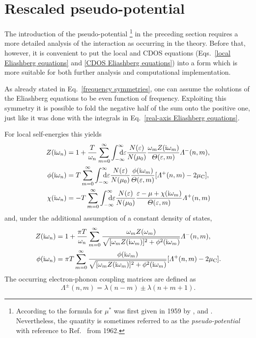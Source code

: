 \section{Rescaled  pseudo-potential}

The introduction of the  pseudo-potential%
%
\footnote{According to  \cite[187]{Schrieffer83} the formula
for $\mu^*$ was first given in 1959 by ,  and
 \cite[83]{BogoliubovTolmachevShirkov59}. Nevertheless, the
quantity is sometimes referred to as the \emph{
pseudo-potential} with reference to Ref.~ from 1962.}
%
in the preceding section requires a more detailed analysis of the 
interaction as occurring in the  theory. Before that, however,
it is convenient to put the local and CDOS  equations
(Eqs.~\ref{local Eliashberg equations} and \ref{CDOS Eliashberg equations}) into
a form which is more suitable for both further analysis and computational
implementation.

As already stated in Eq.~\ref{frequency symmetries}, one can assume the
solutions of the Eliashberg equations to be even function of frequency.
Exploiting this symmetry it is possible to fold the negative half of the
 sum onto the positive one, just like it was done with the
integrals in Eq.~\ref{real-axis Eliashberg equations}.

For local self-energies this yields
%
\begin{align*}
    Z(\I \omega_n) &= 1 + \frac T {\omega_n} \sum_{m = 0}^\infty
    \int \from{-\infty} \till \infty \D \epsilon
    \frac{N(\epsilon)}{N(\mu_0)}
    \frac{\omega_m Z(\I \omega_m)}{\Theta(\epsilon, m)}
    \Lambda^-(n, m),
    \\
    \phi(\I \omega_n) &= T \sum_{m = 0}^\infty
    \int \from{-\infty} \till \infty \D \epsilon
    \frac{N(\epsilon)}{N(\mu_0)}
    \frac{\phi(\I \omega_m)}{\Theta(\epsilon, m)}
    [\Lambda^+(n, m) - 2 \mu \sub C],
    \\
    \chi(\I \omega_n) &= -T \sum_{m = 0}^\infty
    \int \from{-\infty} \till \infty \D \epsilon
    \frac{N(\epsilon)}{N(\mu_0)}
    \frac{\epsilon - \mu + \chi(\I \omega_m)}{\Theta(\epsilon, m)}
    \Lambda^+(n, m)
\end{align*}
%
and, under the additional assumption of a constant density of states,
%
\begin{align*}
    Z(\mathrm i \omega_n) &= 1 + \frac{\pi T}{\omega_n} \sum_{m = 0}^\infty
    \frac
        {\omega_m Z(\omega_m)}
        {\sqrt{[\omega_m Z(\mathrm i \omega_m)]^2 + \phi^2(\mathrm i \omega_m)}}
    \varLambda^-(n, m),
    \\
    \phi(\mathrm i \omega_n) &= \pi T \sum_{m = 0}^\infty
    \frac
        {\phi(\mathrm i \omega_m)}
        {\sqrt{[\omega_m Z(\mathrm i \omega_m)]^2 + \phi^2(\mathrm i \omega_m)}}
    [\varLambda^+(n, m) - 2 \mu \sb{\text{C}}].
\end{align*}
%
The occurring electron-phonon coupling matrices are defined as
%
\begin{equation*}
    \Lambda^\pm(n, m) = \lambda(n - m) \pm \lambda(n + m + 1).
\end{equation*}

